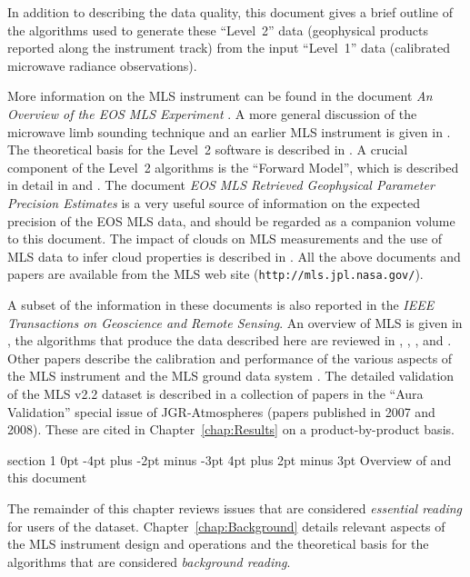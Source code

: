 \documentclass[11pt,draft]{report}
\makeatletter
\renewcommand{\section}{\@startsection%
  {section}%
  {1}%
  {0pt}%
  {-4pt plus -2pt minus -3pt}%
  {4pt plus 2pt minus 3pt}%
  {\Large\sffamily\fontseries{sb}\selectfont\flushleft\color{SectionColor}\figureversion{tabular}}}%
\makeatother
\begin{document}
 
In addition to describing the data quality, this document gives a brief
outline of the algorithms used to generate these ``Level~2'' data
(geophysical products reported along the instrument track) from the
input ``Level~1'' data (calibrated microwave radiance observations).

More information on the MLS instrument can be found in the document
\emph{An Overview of the EOS MLS Experiment} \citep{EOSMLSOverview}.  A
more general discussion of the microwave limb sounding technique and an
earlier MLS instrument is given in \citet{WatersEtal99}.  The
theoretical basis for the Level~2 software is described in
\citet{EOSMLSL2ATBD}.  A crucial component of the Level~2 algorithms is
the ``Forward Model'', which is described in detail in
\citet{EOSMLSFWMATBD} and \citet{EOSMLSPolarizedFWMATBD}.  The document
\emph{EOS MLS Retrieved Geophysical Parameter Precision Estimates}
\citep{EOSMLSPrecision} is a very useful source of information on the
expected precision of the EOS MLS data, and should be regarded as a
companion volume to this document.  The impact of clouds on MLS
measurements and the use of MLS data to infer cloud properties is
described in \cite{EOSMLSCloudATBD}.  All the above documents and papers
are available from the MLS web site (\texttt{http://mls.jpl.nasa.gov/}).

A subset of the information in these documents is also reported in the
\emph{IEEE Transactions on Geoscience and Remote Sensing}.  An overview
of MLS is given in \cite{WatersEtal06}, the algorithms that produce the
data described here are reviewed in \citet{LiveseyEtal06},
\citet{ReadEtal06}, \citet{SchwartzEtal06}, and \citet{WuEtal06}\@.
Other papers describe the calibration and performance of the various
aspects of the MLS instrument
\citep{JarnotEtal06,Pickett06,CofieldAndStek06} and the MLS ground data
system \citep{CuddyEtal06}.  The detailed validation of the MLS v2.2
dataset is described in a collection of papers in the ``Aura
Validation'' special issue of JGR-Atmospheres (papers published in 2007
and 2008).  These are cited in Chapter~\ref{chap:Results} on a
product-by-product basis.

\section{Overview of \thisv and this document}

The remainder of this chapter reviews issues that are considered
\emph{essential reading} for users of the \thisv dataset.
Chapter~\ref{chap:Background} details relevant aspects of the MLS
instrument design and operations and the theoretical basis for the \thisv
algorithms that are considered \emph{background reading}.
\end{document}
